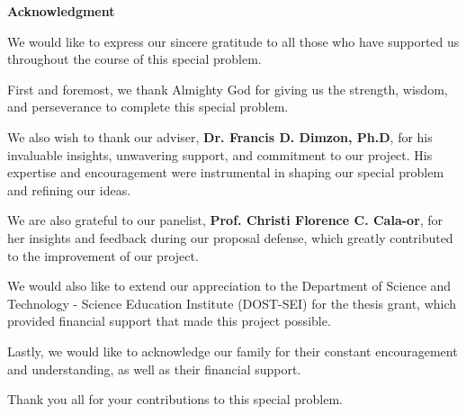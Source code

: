 \begin{center}
	\textbf{Acknowledgment}
\end{center}

We would like to express our sincere gratitude to all those who have supported us throughout the course of this special problem.

First and foremost, we thank Almighty God for giving us the strength, wisdom, and perseverance to complete this special problem.

We also wish to thank our adviser, \textbf{Dr. Francis D. Dimzon, Ph.D}, for his invaluable insights, unwavering support, and commitment to our project. His expertise and encouragement were instrumental in shaping our special problem and refining our ideas.

We are also grateful to our panelist, \textbf{Prof. Christi Florence C. Cala-or}, for her insights and feedback during our proposal defense, which greatly contributed to the improvement of our project.

We would also like to extend our appreciation to the Department of Science and Technology - Science Education Institute (DOST-SEI) for the thesis grant, which provided financial support that made this project possible.

Lastly, we would like to acknowledge our family for their constant encouragement and understanding, as well as their financial support.

Thank you all for your contributions to this special problem.